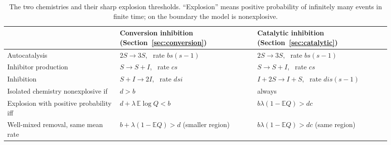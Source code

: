 \documentclass[11pt,a4paper]{article}
\numberwithin{equation}{section}
\theoremstyle{definition}\newtheorem{definition}[theorem]{Definition}
\theoremstyle{remark}\newtheorem{remark}[theorem]{Remark}\newtheorem{example}[theorem]{Example}
\newcommand{\E}{\mathbb E}
\begin{document}
\begin{table}[ht]
\centering\small
\caption{The two chemistries and their sharp explosion thresholds. ``Explosion'' means positive probability of infinitely many events in finite time; on the boundary the model is nonexplosive.}\label{tab:results}
\begin{tabular}{@{}p{0.27\linewidth}p{0.33\linewidth}p{0.32\linewidth}@{}}
\toprule
& Conversion inhibition (Section~\ref{sec:conversion}) & Catalytic inhibition (Section~\ref{sec:catalytic})\\
\midrule
Autocatalysis & $2S\to3S$, \ rate $bs(s-1)$ & $2S\to3S$, \ rate $bs(s-1)$\\
Inhibitor production & $S\to S+I$, \ rate $cs$ & $S\to S+I$, \ rate $cs$\\
Inhibition & $S+I\to2I$, \ rate $dsi$ & $I+2S\to I+S$, \ rate $dis(s-1)$\\
Isolated chemistry nonexplosive if & $d>b$ & always\\
Explosion with positive probability iff & $d+\lambda\,\E\log Q<b$ & $b\lambda(1-\E Q)>dc$\\
Well-mixed removal, same mean rate & $b+\lambda(1-\E Q)>d$ (smaller region) & $b\lambda(1-\E Q)>dc$ (same region)\\
\bottomrule
\end{tabular}
\end{table}
\end{document}
